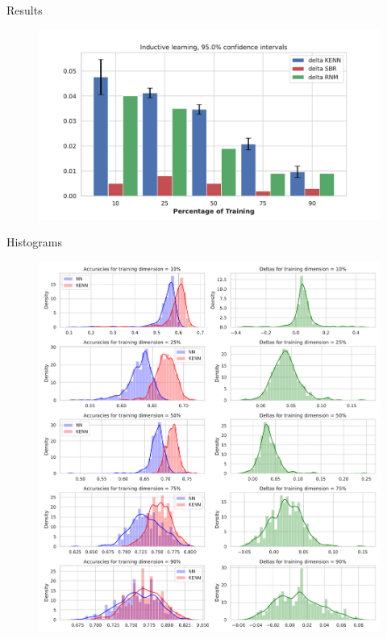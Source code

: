\documentclass{beamer}
\begin{document}


\begin{frame}{Results}
	\begin{figure}
		\centering
		\includegraphics[width=0.9\linewidth]{images/deltas_inductive.pdf}
	\end{figure}
\end{frame}

\begin{frame}{Histograms}
	\begin{figure}
		\includegraphics[width=0.6\linewidth]{images/histograms_inductive.pdf}
	\end{figure}
\end{frame}
\end{document}
